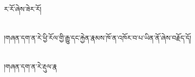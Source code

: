 ར་རོ་ཞེས་ཟེར་རོ།\chapter{ }།གཞན་དག་ན་རེ་ཕྱི་རོལ་གྱི་རྒྱུ་དང་རྐྱེན་རྣམས་ཁོ་ན་འཁོར་བ་པ་ཡིན་ནོ་ཞེས་བརྗོད་དོ།\chapter{ }།གཞན་དག་ན་རེ་རྡུལ་རྣ